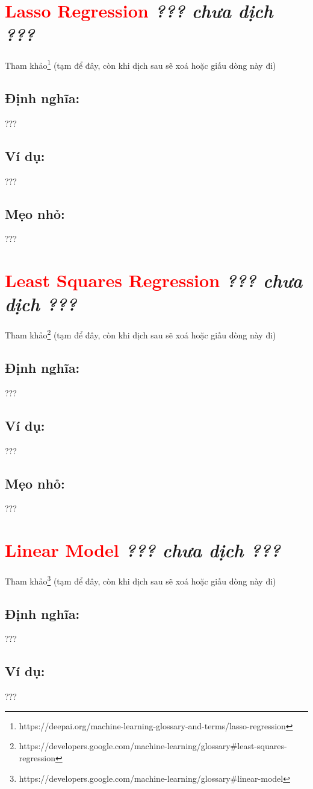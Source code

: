 \section*{\huge \textcolor{Red}{Lasso Regression}  \small \textit{??? chưa dịch ???} }
Tham khảo\footnote{ 	https://deepai.org/machine-learning-glossary-and-terms/lasso-regression} (tạm để đây, còn khi dịch sau sẽ xoá hoặc giấu dòng này đi)
\subsection*{Định nghĩa:}
???
\subsection*{Ví dụ:}
???
\subsection*{Mẹo nhỏ:}
???
\section*{\huge \textcolor{Red}{Least Squares Regression}  \small \textit{??? chưa dịch ???} }
Tham khảo\footnote{https://developers.google.com/machine-learning/glossary\#least-squares-regression} (tạm để đây, còn khi dịch sau sẽ xoá hoặc giấu dòng này đi)
\subsection*{Định nghĩa:}
???
\subsection*{Ví dụ:}
???
\subsection*{Mẹo nhỏ:}
???
\section*{\huge \textcolor{Red}{Linear Model}  \small \textit{??? chưa dịch ???} }
Tham khảo\footnote{https://developers.google.com/machine-learning/glossary\#linear-model} (tạm để đây, còn khi dịch sau sẽ xoá hoặc giấu dòng này đi)
\subsection*{Định nghĩa:}
???
\subsection*{Ví dụ:}
???
